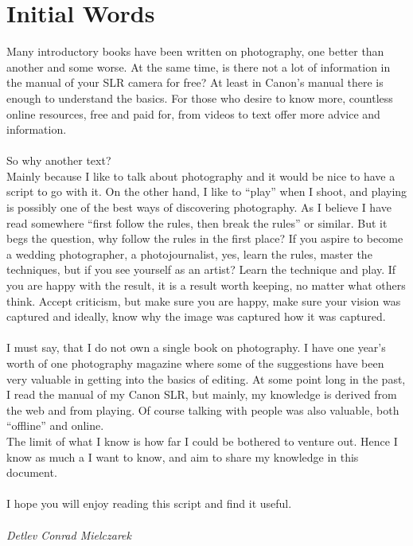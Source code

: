 \chapter*{Initial Words}


Many introductory books have been written on photography, one better than another and some worse. At the same time, is there not a lot of information in the manual of your SLR camera for free? At least in Canon's manual there is enough to understand the basics. For those who desire to know more, countless online resources, free and paid for, from videos to text offer more advice and information.
\\
\\
So why another text?
\\
Mainly because I like to talk about photography and it would be nice to have a script to go with it. On the other hand, I like to ``play'' when I shoot, and playing is possibly one of the best ways of discovering photography. As I believe I have read somewhere ``first follow the rules, then break the rules'' or similar. 
But it begs the question, why follow the rules in the first place? If you aspire to become a wedding photographer, a photojournalist, yes, learn the rules, master the techniques, but if you see yourself as an artist? Learn the technique and play. If you are happy with the result, it is a result worth keeping, no matter what others think. Accept criticism, but make sure you are happy, make sure your vision was captured and ideally, know why the image was captured how it was captured.
\\
\\
I must say, that I do not own a single book on photography. I have one year's worth of one photography magazine where some of the suggestions have been very valuable in getting into the basics of editing. At some point long in the past, I read the manual of my Canon SLR, but mainly, my knowledge is derived from the web and from playing. Of course talking with people was also valuable, both ``offline'' and online.
\\
The limit of what I know is how far I could be bothered to venture out. Hence I know as much a I want to know, and aim to share my knowledge in this document.
\\
\\
I hope you will enjoy reading this script and find it useful.
\\
\\
\textit{Detlev Conrad Mielczarek}


